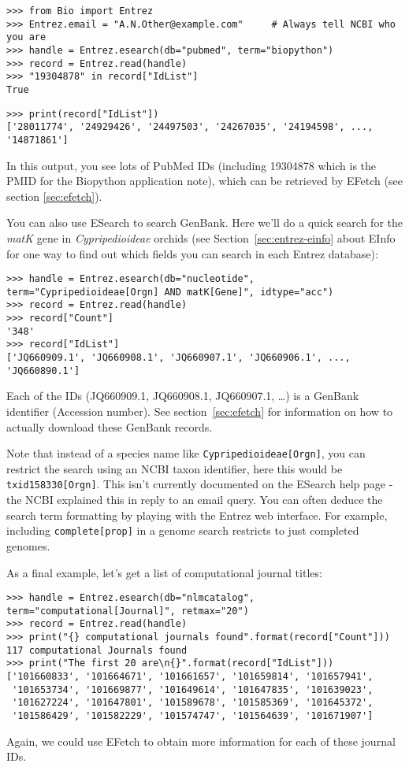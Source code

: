 \begin{verbatim}
>>> from Bio import Entrez
>>> Entrez.email = "A.N.Other@example.com"     # Always tell NCBI who you are
>>> handle = Entrez.esearch(db="pubmed", term="biopython")
>>> record = Entrez.read(handle)
>>> "19304878" in record["IdList"]
True
\end{verbatim}
\begin{verbatim}
>>> print(record["IdList"])
['28011774', '24929426', '24497503', '24267035', '24194598', ..., '14871861']
\end{verbatim}
In this output, you see lots of PubMed IDs (including 19304878 which is the PMID for the Biopython application note), which can be retrieved by EFetch (see section \ref{sec:efetch}).

You can also use ESearch to search GenBank. Here we'll do a quick
search for the \emph{matK} gene in \emph{Cypripedioideae} orchids
(see Section~\ref{sec:entrez-einfo} about EInfo for one way to
find out which fields you can search in each Entrez database):

\begin{verbatim}
>>> handle = Entrez.esearch(db="nucleotide", term="Cypripedioideae[Orgn] AND matK[Gene]", idtype="acc")
>>> record = Entrez.read(handle)
>>> record["Count"]
'348'
>>> record["IdList"]
['JQ660909.1', 'JQ660908.1', 'JQ660907.1', 'JQ660906.1', ..., 'JQ660890.1']
\end{verbatim}

\noindent Each of the IDs (JQ660909.1, JQ660908.1, JQ660907.1, \ldots) is a GenBank identifier (Accession number).
See section~\ref{sec:efetch} for information on how to actually download these GenBank records.

Note that instead of a species name like \texttt{Cypripedioideae[Orgn]}, you can restrict the search using an NCBI taxon identifier, here this would be \texttt{txid158330[Orgn]}.  This isn't currently documented on the ESearch help page - the NCBI explained this in reply to an email query.  You can often deduce the search term formatting by playing with the Entrez web interface.  For example, including \texttt{complete[prop]} in a genome search restricts to just completed genomes.

As a final example, let's get a list of computational journal titles:
\begin{verbatim}
>>> handle = Entrez.esearch(db="nlmcatalog", term="computational[Journal]", retmax="20")
>>> record = Entrez.read(handle)
>>> print("{} computational journals found".format(record["Count"]))
117 computational Journals found
>>> print("The first 20 are\n{}".format(record["IdList"]))
['101660833', '101664671', '101661657', '101659814', '101657941',
 '101653734', '101669877', '101649614', '101647835', '101639023',
 '101627224', '101647801', '101589678', '101585369', '101645372',
 '101586429', '101582229', '101574747', '101564639', '101671907']
\end{verbatim}
Again, we could use EFetch to obtain more information for each of these journal IDs.

